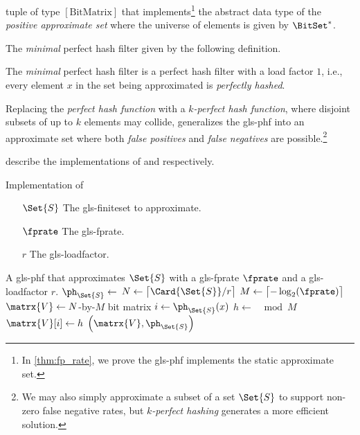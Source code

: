 \documentclass[ ../main.tex]{subfiles}
\begin{document}
tuple of type $[\textrm{BitMatrix}]$ that implements\footnote{In \cref{thm:fp_rate}, we prove the \gls{gls-phf} implements the static approximate set.} the abstract data type of the \emph{positive approximate set} where the universe of elements is given by $\BitSet^*$.


The \emph{minimal} perfect hash filter given by the following definition.
\begin{definition}
The \emph{minimal} perfect hash filter is a perfect hash filter with a load factor $1$, i.e., every element $x$ in the set being approximated is \emph{perfectly hashed}.
\end{definition}
Replacing the \emph{perfect hash function} with a \emph{$k$-perfect hash function}, where disjoint subsets of up to $k$ elements may collide, generalizes the \gls{gls-phf} into an approximate set where both \emph{false positives} and \emph{false negatives} are possible.\footnote{We may also simply approximate a subset of a set $\Set{S}$ to support non-zero false negative rates, but \emph{$k$-perfect hashing} generates a more efficient solution.}

 describe the implementations of \MakeApproxSet and \Contains respectively.
\begin{algorithm}[h]
    \caption{Implementation of \protect\MakeApproxSet}
    \label{alg:PHF}
    \KwIn
    {
        \begin{itemize}
            \item[$\Set{S}$] The \gls{gls-finiteset} to approximate.
            \item[$\fprate$] The \gls{gls-fprate}.
            \item[$r$] The \gls{gls-loadfactor}.
        \end{itemize}
    }
    \KwOut
    {
        A \gls{gls-phf} that approximates $\Set{S}$ with a \gls{gls-fprate} $\fprate$ and a \gls{gls-loadfactor} $r$.
    }
    {
        $\ph_{\Set{S}} \gets$ \;
        $N \gets \left\lceil \Card{\Set{S}} / r \right\rceil$\;
        $M \gets \left\lceil -\log_2\!\left(\fprate\right) \right\rceil$\;
        $\matrx{V} \gets N$-by-$M$ bit matrix\;
        {
            $i \gets \ph_{\Set{S}}\!\left(x\right)$\;
            $h \gets$ $\mod M$\;
            $\matrx{V}\!\left[i\right] \gets h$\;
        }
        \Return $\left(\matrx{V}, \ph_{\Set{S}}\right)$\;
    }
\end{algorithm}
\end{document}
